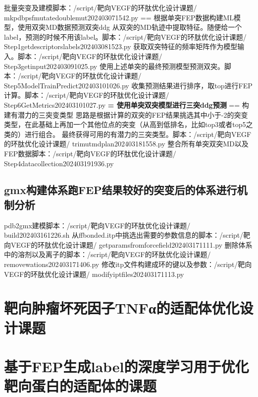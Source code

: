 \newline\indent 批量突变及建模脚本：/script/靶向VEGF的环肽优化设计课题/ mkpdbpsfmutatedoublemut202403071542.py
\newline == 根据单突FEP数据构建ML模型，使用双突MD数据预测双突ddg
\newline\indent 从双突的MD轨迹中提取特征。随便给一个label，预测的时候不用该label。脚本：/script/靶向VEGF的环肽优化设计课题/ Step1getdescriptorslabels202403081523.py
\newline\indent 获取双突特征的频率矩阵作为模型输入。脚本：/script/靶向VEGF的环肽优化设计课题/ Step3getinput202403091025.py
\newline\indent 使用上述单突的最终预测模型预测双突。脚本：/script/靶向VEGF的环肽优化设计课题/ Step5ModelTrainPredict202403101026.py
\newline\indent 收集预测结果进行排序，取top进行FEP计算。脚本：/script/靶向VEGF的环肽优化设计课题/ Step6GetMetrics202403101027.py
\newline\noindent\textbf{= 使用单突双突模型进行三突ddg预测}
\newline == 构建有潜力的三突变类型
\newline\indent 思路是根据计算的双突的FEP结果挑选其中小于-2的突变类型，在此基础上再加一个其他位点的突变（从高到低排名，比如top3或者top5之类的）进行组合。
最终获得可用的有潜力的三突类型。脚本：/script/靶向VEGF的环肽优化设计课题/ trimutmdplan202403181558.py
\newline\indent 整合所有单突双突MD以及FEP数据脚本：/script/靶向VEGF的环肽优化设计课题/ Step4datacollection202403191936.py
\subsection{gmx构建体系跑FEP结果较好的突变后的体系进行机制分析}
pdb2gmx建模脚本：/script/靶向VEGF的环肽优化设计课题/ build202403161226.sh
\newline\indent 从ffbonded.itp中挑选出需要的参数信息的脚本：/script/靶向VEGF的环肽优化设计课题/ getparamsfromforcefield202403171111.py
\newline\indent 删除体系中的溶剂以及离子的脚本：/script/靶向VEGF的环肽优化设计课题/ removewations202403171406.py
\newline\indent 修改itp文件构建成环的键以及参数：/script/靶向VEGF的环肽优化设计课题/ modifyiptfiles202403171113.py
\section{靶向肿瘤坏死因子TNFα的适配体优化设计课题}
\section{基于FEP生成label的深度学习用于优化靶向蛋白的适配体的课题}
